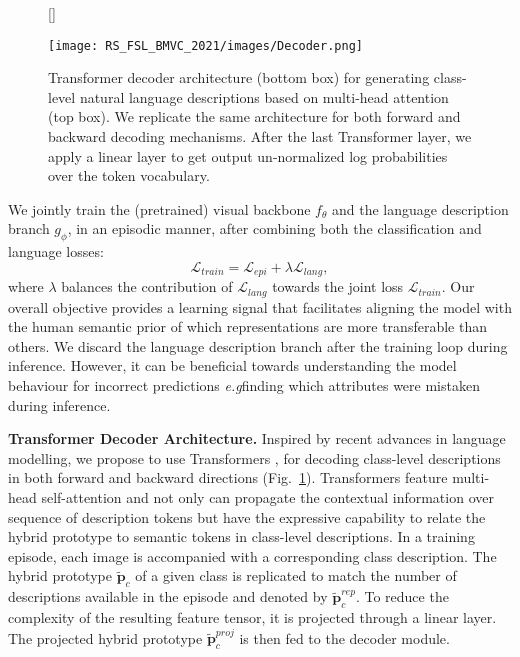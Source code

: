 \documentclass{bmvc2k}
\def\eg{\emph{e.g}\bmvaOneDot}
\begin{document}
\begin{figure}
[\FBwidth]
{\caption{Transformer decoder architecture (bottom box) for generating class-level natural language descriptions based on multi-head attention (top box). We replicate the same architecture for both forward and backward decoding mechanisms. After the last Transformer layer, we apply a linear layer to get output un-normalized log probabilities over the token vocabulary.}\label{fig:transformer_decoder}}
{\texttt{[image: RS\_FSL\_BMVC\_2021/images/Decoder.png]}}
\end{figure}
We jointly train the (pretrained) visual backbone $f_{\theta}$ and the language description branch $g_{\phi}$, in an episodic manner, after combining both the classification and language losses:
\begin{equation}
    \mathcal{L}_{train}= \mathcal{L}_{epi} + \lambda \mathcal{L}_{lang}, \label{Eq:train_loss}
\end{equation}
\noindent where $\lambda$ balances the contribution of $\mathcal{L}_{lang}$ towards the joint loss $\mathcal{L}_{train}$. Our overall objective provides a learning signal that facilitates aligning the model with the human semantic prior of which representations are more transferable than others. We discard the language description branch after the training loop during inference. However, it can be beneficial towards understanding the model behaviour for incorrect predictions \eg finding which attributes were mistaken during inference.

\noindent \textbf{Transformer Decoder Architecture.} Inspired by recent advances in language modelling, we propose to use Transformers \cite{transformer}, for decoding class-level descriptions in both forward and backward directions (Fig.~\ref{fig:transformer_decoder}). Transformers feature multi-head self-attention and not only can propagate the contextual information over sequence of description tokens but have the expressive capability to relate the hybrid prototype to semantic tokens in class-level descriptions. In a training episode, each image is accompanied with a corresponding class description. The hybrid prototype $\tilde{\textbf{p}}_{c}$ of a given class is replicated to match the number of descriptions available in the episode and denoted by $\tilde{\textbf{p}}_{c}^{rep}$. To reduce the complexity of the resulting feature tensor, it is projected through a linear layer. The projected hybrid prototype $\tilde{\textbf{p}}_{c}^{proj}$ is then fed to the decoder module. 
\end{document}
